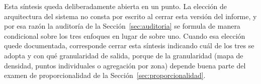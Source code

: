 Esta síntesis queda deliberadamente abierta en un punto. La elección de arquitectura del sistema no consta por escrito al cerrar esta
versión del informe, y por esa razón la auditoría de la
Sección~\ref{sec:auditoria} se formula de manera condicional sobre los
tres enfoques en lugar de sobre uno. Cuando esa elección quede
documentada, corresponde cerrar esta síntesis indicando cuál de los tres
se adopta y con qué granularidad de salida, porque de la granularidad
(mapa de densidad, puntos individuales o agregación por zona)
depende buena parte del examen de proporcionalidad de la
Sección~\ref{sec:proporcionalidad}.

